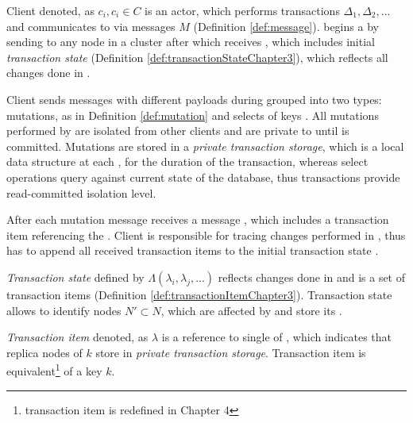 Client denoted, as $c_{i}, c_{i}\in\mathit{C}$ is an actor, which performs transactions $\Delta_{1}, \Delta_{2}, ...$ and communicates to \nodes via messages $\mathit{M}$ (Definition \ref{def:message}). \client begins a \transaction by sending \beginTransactionMessage to any node in a cluster after which \client receives 
\initialTxStateMessage, which includes 
initial \emph{transaction state} (Definition \ref{def:transactionStateChapter3}), which reflects all changes done in \transaction.

Client \client sends messages with different payloads during \transaction grouped into two types: mutations, as in Definition \ref{def:mutation} and selects of keys \selectMessage. 
All mutations \mutations performed by \client are isolated from other clients and are private to \transaction until \transaction is committed. Mutations are stored in a \emph{private transaction storage}, which is a local data structure at each , for the duration of the transaction, whereas select operations query against current state of the database, thus transactions provide read-committed isolation level.

After each mutation message \client receives a message \updateTxStateMessage, which includes a transaction item \txItem referencing the . Client is responsible for tracing changes performed in \transaction, thus \client has to append all received transaction items to the initial transaction state \txState.

\begin{definition}
\label{def:transactionStateChapter3}
\emph{Transaction state} defined by $\Lambda(\lambda_{i}, \lambda_{j}, ...)$ reflects changes done in \transaction and is a set of transaction items (Definition \ref{def:transactionItemChapter3}). Transaction state allows to identify nodes $N' \subset N$, which are affected by \transaction and store its \mutations.
\end{definition}

\begin{definition}
\label{def:transactionItemChapter3}
\emph{Transaction item} denoted, as $\lambda$ is a reference to single  of \transaction, which indicates that replica nodes of $k$ store  in \emph{private transaction storage}. Transaction item is equivalent\footnote{transaction item is redefined in Chapter 4} of a key $k$.
\end{definition}


